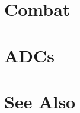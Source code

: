 \section{Combat}

\section{ADCs}
\begin{adclist}
\end{adclist}

\section{See Also}
\begin{typelist}
\end{typelist}

\clearpage
\listofnotes

